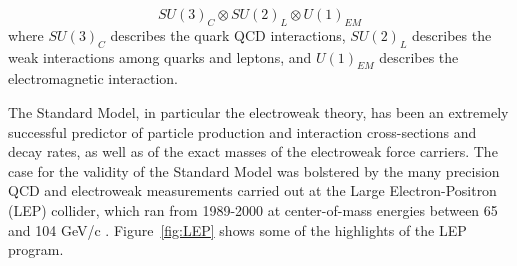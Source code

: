 \documentclass[dissertation.tex]{subfiles}
\begin{document}
\begin{equation}
SU(3)_{C} \otimes SU(2)_{L} \otimes U(1)_{EM}
\end{equation}
where $SU(3)_{C}$ describes the quark QCD interactions, $SU(2)_{L}$ describes the weak interactions among quarks and leptons, and $U(1)_{EM}$ describes the electromagnetic interaction.

The Standard Model, in particular the electroweak theory, has been an extremely successful predictor of particle production and interaction cross-sections and decay rates, as well as of the exact masses of the electroweak force carriers.  The case for the validity of the Standard Model was bolstered by the many precision QCD and electroweak measurements carried out at the Large Electron-Positron (LEP) collider, which ran from 1989-2000 at center-of-mass energies between 65 and 104 GeV/c \cite{Drees}.  Figure~\ref{fig:LEP} shows some of the highlights of the LEP program.
\end{document}

